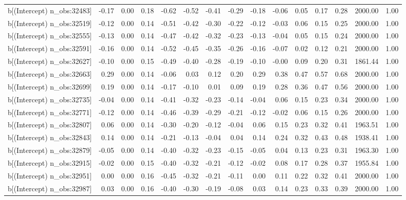 \begin{table}[ht]
\begin{tabular}{rrrrrrrrrrrrrrr}
  b[(Intercept) n\_obs:32483] & -0.17 & 0.00 & 0.18 & -0.62 & -0.52 & -0.41 & -0.29 & -0.18 & -0.06 & 0.05 & 0.17 & 0.28 & 2000.00 & 1.00 \\ 
  b[(Intercept) n\_obs:32519] & -0.12 & 0.00 & 0.14 & -0.51 & -0.42 & -0.30 & -0.22 & -0.12 & -0.03 & 0.06 & 0.15 & 0.25 & 2000.00 & 1.00 \\ 
  b[(Intercept) n\_obs:32555] & -0.13 & 0.00 & 0.14 & -0.47 & -0.42 & -0.32 & -0.23 & -0.13 & -0.04 & 0.05 & 0.15 & 0.24 & 2000.00 & 1.00 \\ 
  b[(Intercept) n\_obs:32591] & -0.16 & 0.00 & 0.14 & -0.52 & -0.45 & -0.35 & -0.26 & -0.16 & -0.07 & 0.02 & 0.12 & 0.21 & 2000.00 & 1.00 \\ 
  b[(Intercept) n\_obs:32627] & -0.10 & 0.00 & 0.15 & -0.49 & -0.40 & -0.28 & -0.19 & -0.10 & -0.00 & 0.09 & 0.20 & 0.31 & 1861.44 & 1.00 \\ 
  b[(Intercept) n\_obs:32663] & 0.29 & 0.00 & 0.14 & -0.06 & 0.03 & 0.12 & 0.20 & 0.29 & 0.38 & 0.47 & 0.57 & 0.68 & 2000.00 & 1.00 \\ 
  b[(Intercept) n\_obs:32699] & 0.19 & 0.00 & 0.14 & -0.17 & -0.10 & 0.01 & 0.09 & 0.19 & 0.28 & 0.36 & 0.47 & 0.56 & 2000.00 & 1.00 \\ 
  b[(Intercept) n\_obs:32735] & -0.04 & 0.00 & 0.14 & -0.41 & -0.32 & -0.23 & -0.14 & -0.04 & 0.06 & 0.15 & 0.23 & 0.34 & 2000.00 & 1.00 \\ 
  b[(Intercept) n\_obs:32771] & -0.12 & 0.00 & 0.14 & -0.46 & -0.39 & -0.29 & -0.21 & -0.12 & -0.02 & 0.06 & 0.15 & 0.26 & 2000.00 & 1.00 \\ 
  b[(Intercept) n\_obs:32807] & 0.06 & 0.00 & 0.14 & -0.30 & -0.20 & -0.12 & -0.04 & 0.06 & 0.15 & 0.23 & 0.32 & 0.41 & 1963.51 & 1.00 \\ 
  b[(Intercept) n\_obs:32843] & 0.14 & 0.00 & 0.14 & -0.21 & -0.13 & -0.04 & 0.04 & 0.14 & 0.24 & 0.32 & 0.43 & 0.48 & 1938.41 & 1.00 \\ 
  b[(Intercept) n\_obs:32879] & -0.05 & 0.00 & 0.14 & -0.40 & -0.32 & -0.23 & -0.15 & -0.05 & 0.04 & 0.13 & 0.23 & 0.31 & 1963.30 & 1.00 \\ 
  b[(Intercept) n\_obs:32915] & -0.02 & 0.00 & 0.15 & -0.40 & -0.32 & -0.21 & -0.12 & -0.02 & 0.08 & 0.17 & 0.28 & 0.37 & 1955.84 & 1.00 \\ 
  b[(Intercept) n\_obs:32951] & 0.00 & 0.00 & 0.16 & -0.45 & -0.32 & -0.21 & -0.11 & 0.00 & 0.11 & 0.22 & 0.32 & 0.41 & 2000.00 & 1.00 \\ 
  b[(Intercept) n\_obs:32987] & 0.03 & 0.00 & 0.16 & -0.40 & -0.30 & -0.19 & -0.08 & 0.03 & 0.14 & 0.23 & 0.33 & 0.39 & 2000.00 & 1.00 \\ 

\end{tabular}
\end{table}
